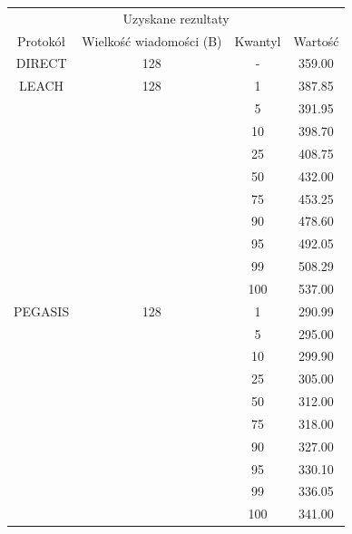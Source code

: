 \documentclass[a4paper,12pt,twoside,openany]{report}
\begin{document}
\begin{longtable}{*{4}{c}}
\toprule
\multicolumn{4}{c}{Uzyskane rezultaty} \\
Protokół	& Wielkość wiadomości (B)	& Kwantyl	& Wartość \\
\midrule
\endhead
DIRECT	& 128 	& -	& 359.00 \\*
\midrule
LEACH	& 128	& 1	& 387.85 \\*
	&	& 5	& 391.95 \\*
	&	& 10	& 398.70 \\*
	&	& 25	& 408.75 \\*
	&	& 50	& 432.00 \\*
	&	& 75	& 453.25 \\*
	&	& 90	& 478.60 \\*
	&	& 95	& 492.05 \\*
	&	& 99	& 508.29 \\*
	&	& 100	& 537.00 \\*
\midrule
PEGASIS	& 128	& 1	& 290.99 \\*
	&	& 5	& 295.00 \\*
	&	& 10	& 299.90 \\*
	&	& 25	& 305.00 \\*
	&	& 50	& 312.00 \\*
	&	& 75	& 318.00 \\*
	&	& 90	& 327.00 \\*
	&	& 95	& 330.10 \\*
	&	& 99	& 336.05 \\*
	&	& 100	& 341.00 \\*
\bottomrule
\end{longtable}
\end{document}
